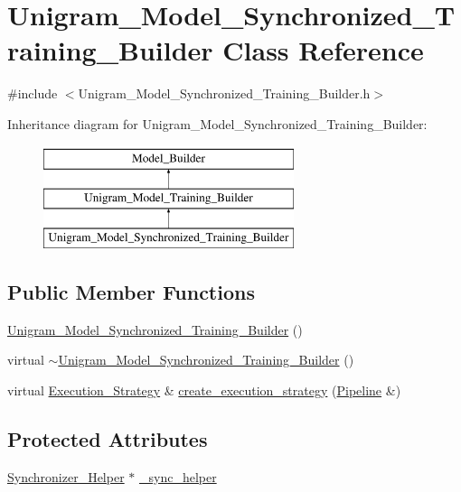 \hypertarget{class_unigram___model___synchronized___training___builder}{
\section{Unigram\_\-Model\_\-Synchronized\_\-Training\_\-Builder Class Reference}
\label{class_unigram___model___synchronized___training___builder}
}


{\ttfamily \#include $<$Unigram\_\-Model\_\-Synchronized\_\-Training\_\-Builder.h$>$}

Inheritance diagram for Unigram\_\-Model\_\-Synchronized\_\-Training\_\-Builder:\begin{figure}[H]
\begin{center}
\leavevmode
\includegraphics[height=3cm]{class_unigram___model___synchronized___training___builder}
\end{center}
\end{figure}
\subsection*{Public Member Functions}
\begin{DoxyCompactItemize}
\item 
\hyperlink{class_unigram___model___synchronized___training___builder_a3d7453579805a5e7b54d28a763563c21}{Unigram\_\-Model\_\-Synchronized\_\-Training\_\-Builder} ()
\item 
virtual \hyperlink{class_unigram___model___synchronized___training___builder_a65988d299319d6f46171a3f3cfeb9500}{$\sim$Unigram\_\-Model\_\-Synchronized\_\-Training\_\-Builder} ()
\item 
virtual \hyperlink{class_execution___strategy}{Execution\_\-Strategy} \& \hyperlink{class_unigram___model___synchronized___training___builder_a756ac51fbf24f5c0381dfe402ee53ef0}{create\_\-execution\_\-strategy} (\hyperlink{class_pipeline}{Pipeline} \&)
\end{DoxyCompactItemize}
\subsection*{Protected Attributes}
\begin{DoxyCompactItemize}
\item 
\hyperlink{class_synchronizer___helper}{Synchronizer\_\-Helper} $\ast$ \hyperlink{class_unigram___model___synchronized___training___builder_ae77faaafd77e4278deb69b811d3bfba9}{\_\-sync\_\-helper}
\end{DoxyCompactItemize}


